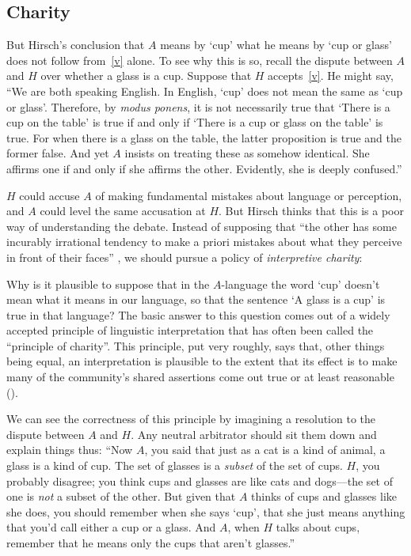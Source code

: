 \documentclass[11pt]{article}
\newenvironment{squote}{%
\begin{spacing}{1}
       	\begin{list}{}{%
\setlength{\labelwidth}{0pt}%
\rightmargin\leftmargin%
}
\item\relax
}{%
\end{list}%
\end{spacing}
}
\begin{document}
\begin{spacing}{1.25}
\subsection{Charity}
\label{charity}
But Hirsch's conclusion that $A$ means by `cup' what he means by `cup
or glass' does not follow from~\ref{v} alone.  To see why this is so,
recall the dispute between $A$ and $H$ over whether a glass is a cup.
Suppose that $H$ accepts~\ref{v}.  He might say, ``We are both
speaking English.  In English, `cup' does not mean the same as `cup or
glass'. Therefore, by {\em modus ponens}, it is not necessarily true
that `There is a cup on the table' is true if and only if `There is a
cup or glass on the table' is true.  For when there is a glass on the
table, the latter proposition is true and the former false.  And yet
$A$ insists on treating these as somehow identical.  She affirms one
if and only if she affirms the other.  Evidently, she is deeply
confused.''

$H$ could accuse $A$ of making fundamental mistakes about language or
perception, and $A$ could level the same accusation at $H$.  But
Hirsch thinks that this is a poor way of understanding the
debate.  Instead of supposing that ``the other has some incurably
irrational tendency to make a priori mistakes about what they perceive
in front of their faces'' \citep[78]{hirsch2005}, we should pursue a
policy of {\em interpretive charity}:

\begin{squote}
Why is it plausible to suppose that in the $A$-language the word `cup'
doesn't mean what it means in our language, so that the sentence `A
glass is a cup' is true in that language?  The basic answer to this
question comes out of a widely accepted principle of linguistic
interpretation that has often been called the ``principle of
charity''.  This principle, put very roughly, says that, other things
being equal, an interpretation is plausible to the extent that its
effect is to make many of the community's shared assertions come out
true or at least reasonable (\citeyear[71]{hirsch2005}).
\end{squote}

We can see the correctness of this principle by imagining a resolution
to the dispute between $A$ and $H$.  Any neutral arbitrator should sit
them down and explain things thus: ``Now $A$, you said that just as a
cat is a kind of animal, a glass is a kind of cup.  The set of glasses
is a {\em subset} of the set of cups.  $H$, you probably disagree; you
think cups and glasses are like cats and dogs---the set of one is {\em
  not} a subset of the other.  But given that $A$ thinks of cups and
glasses like she does, you should remember when she says `cup', that
she just means anything that you'd call either a cup or a glass.  And
$A$, when $H$ talks about cups, remember that he means only the cups
that aren't glasses.''


\end{spacing}
\end{document}
